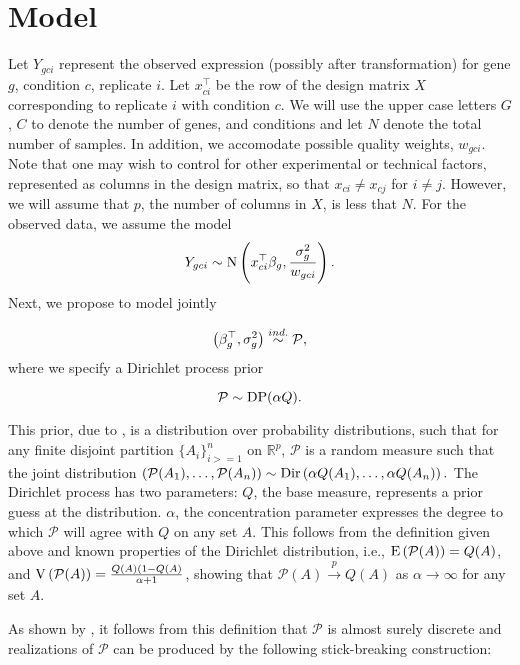 \section{Model}
\label{sec:model}
Let $Y_{gci}$ represent the observed expression (possibly after transformation) for gene $g$, condition $c$, replicate $i$. Let $x_{ci}^\top$ be the row of the design matrix $X$ corresponding to replicate $i$ with condition $c$. We will use the upper case letters $G$, $C$ to denote the number of genes, and conditions and let $N$ denote the total number of samples. In addition, we accomodate possible quality weights, $w_{gci}$.  Note that one may wish to control for other experimental or technical factors, represented as columns in the design matrix, so that $x_{ci} \neq x_{cj}$ for $i \neq j$. However, we will assume that $p$,  the number of columns in $X$, is less that $N$. For the observed data, we assume the model
\begin{equation}
Y_{gci} \sim \operatorname{N} \left( x_{ci}^\top \beta_g, \frac{\sigma^2_g}{w_{gci}} \right).
\end{equation}
Next, we propose to model jointly

\begin{equation}
\left(\beta_g^\top,\sigma^2_g\right) \stackrel{ind.}{\sim} \mathcal{P},
\end{equation}
where we specify a Dirichlet process prior

\begin{equation}
\mathcal{P} \sim \operatorname{DP}(\alpha Q).
\end{equation}

This prior, due to \citet{ferguson}, is a distribution over probability distributions, such that for any finite disjoint partition $\{A_i\}_{i>=1}^n$ on $\mathbb{R}^p$, $\mathcal{P}$ is a random measure such that the joint distribution $\left(\mathcal{P}(A_1),\ldots,\mathcal{P}(A_n)\right) \sim \operatorname{Dir}\left(\alpha Q(A_1),\ldots,\alpha Q(A_n)\right).$ The Dirichlet process has two parameters: $Q$, the base measure, represents a prior guess at the distribution. $\alpha$, the concentration parameter expresses the degree to which $\mathcal{P}$ will agree with $Q$ on any set $A$. This follows from the definition given above and known properties of the Dirichlet distribution, i.e., $\operatorname{E}\left(\mathcal{P}(A)\right)=Q(A)$, and $\operatorname{V}\left(\mathcal{P}(A)\right)=\frac{Q(A)(1 - Q(A)}{\alpha + 1}$, showing that $\mathcal{P}(A) \stackrel{p}{\rightarrow} Q(A)$ as $\alpha \rightarrow \infty$ for any set $A$. 

As shown by \citet{sethuraman}, it follows from this definition that $\mathcal{P}$ is almost surely discrete and realizations of $\mathcal{P}$ can be produced by the following stick-breaking construction:

